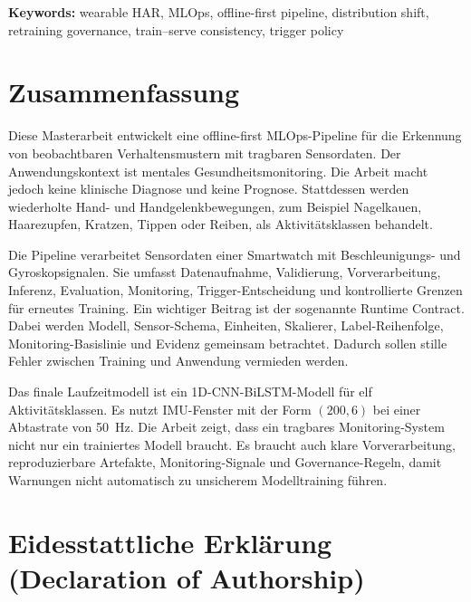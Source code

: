 \documentclass[12pt,a4paper,oneside]{report}
\begin{document}
\bigskip
\noindent
\textbf{Keywords:} wearable HAR, MLOps, offline-first pipeline, distribution shift, retraining governance, train--serve consistency, trigger policy

\chapter*{Zusammenfassung}

Diese Masterarbeit entwickelt eine offline-first MLOps-Pipeline für die Erkennung von beobachtbaren Verhaltensmustern mit tragbaren Sensordaten. Der Anwendungskontext ist mentales Gesundheitsmonitoring. Die Arbeit macht jedoch keine klinische Diagnose und keine Prognose. Stattdessen werden wiederholte Hand- und Handgelenkbewegungen, zum Beispiel Nagelkauen, Haarezupfen, Kratzen, Tippen oder Reiben, als Aktivitätsklassen behandelt.

Die Pipeline verarbeitet Sensordaten einer Smartwatch mit Beschleunigungs- und Gyroskopsignalen. Sie umfasst Datenaufnahme, Validierung, Vorverarbeitung, Inferenz, Evaluation, Monitoring, Trigger-Entscheidung und kontrollierte Grenzen für erneutes Training. Ein wichtiger Beitrag ist der sogenannte Runtime Contract. Dabei werden Modell, Sensor-Schema, Einheiten, Skalierer, Label-Reihenfolge, Monitoring-Basislinie und Evidenz gemeinsam betrachtet. Dadurch sollen stille Fehler zwischen Training und Anwendung vermieden werden.

Das finale Laufzeitmodell ist ein 1D-CNN-BiLSTM-Modell für elf Aktivitätsklassen. Es nutzt IMU-Fenster mit der Form \((200,6)\) bei einer Abtastrate von 50~Hz. Die Arbeit zeigt, dass ein tragbares Monitoring-System nicht nur ein trainiertes Modell braucht. Es braucht auch klare Vorverarbeitung, reproduzierbare Artefakte, Monitoring-Signale und Governance-Regeln, damit Warnungen nicht automatisch zu unsicherem Modelltraining führen.

\chapter*{Eidesstattliche Erkl\"arung\\(Declaration of Authorship)}
\end{document}
